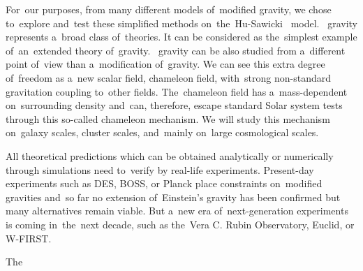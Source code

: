 For~our purposes, from many different models of~modified gravity, we chose to~explore and~test these simplified methods on~the~Hu-Sawicki \fR\ model. \fR\ gravity represents a~broad class of~theories. It can be considered as the~simplest example of~an~extended theory of~gravity. \fR\ gravity can be also studied from a~different point of~view than a~modification of~gravity. We can see this extra degree of~freedom as a~new scalar field, chameleon field, with~strong non-standard gravitation coupling to~other fields. The~chameleon field has a~mass-dependent on~surrounding density and~can, therefore, escape standard Solar system tests through this so-called chameleon mechanism. We will study this mechanism on~galaxy scales, cluster scales, and~mainly on~large cosmological scales.

All theoretical predictions which can be obtained analytically or numerically through simulations need to~verify by real-life experiments. Present-day experiments such as DES, BOSS, or Planck place constraints on~modified gravities and~so far no extension of~Einstein's gravity has been confirmed but many alternatives remain viable. But a~new era of~next-generation experiments is coming in~the~next decade, such as the~Vera C. Rubin Observatory, Euclid, or W-FIRST.


The~\DIFdelbegin {}%

